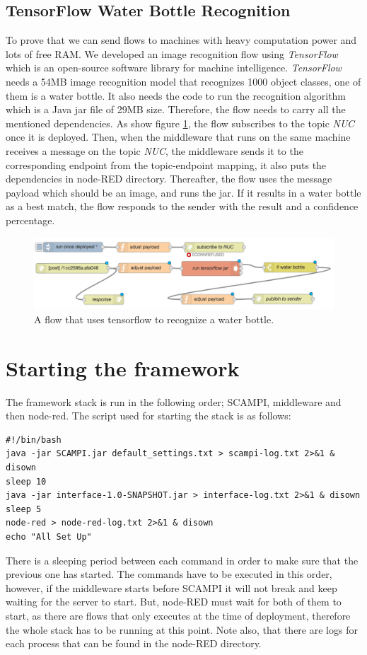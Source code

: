\subsection{TensorFlow Water Bottle Recognition} \label{subsec:tensor}
To prove that we can send flows to machines with heavy computation power and lots of free RAM. We developed an image recognition flow using \textit{TensorFlow} which is an open-source software library for machine intelligence. \textit{TensorFlow} needs a 54MB image recognition model that recognizes 1000 object classes, one of them is a water bottle. It also needs the code to run the recognition algorithm which is a Java jar file of 29MB size. Therefore, the flow  needs to carry all the mentioned dependencies. As show figure \ref{fig:flow-tensor}, the flow subscribes to the topic \textit{NUC} once it is deployed. Then, when the middleware that runs on the same machine receives a message on the topic \textit{NUC}, the middleware sends it to the corresponding endpoint  from the topic-endpoint mapping, it also puts the dependencies in node-RED directory. Thereafter, the flow uses the message payload which should be an image, and runs the jar. If it results in a water bottle as a best match, the flow responds to the sender with the result and a confidence percentage.
 \begin{figure}[H]
	\centering
	\includegraphics[scale=0.6]{images/flow-tensor.png}
	\caption{A flow that uses tensorflow to recognize a water bottle.}
	\label{fig:flow-tensor}
\end{figure} 

\section{Starting the framework}\label{subsec:starting-framework}

The framework stack is run in the following order; SCAMPI, middleware and then node-red. The script used for starting the stack is as follows:
\begin{verbatim}
#!/bin/bash
java -jar SCAMPI.jar default_settings.txt > scampi-log.txt 2>&1 & disown
sleep 10
java -jar interface-1.0-SNAPSHOT.jar > interface-log.txt 2>&1 & disown
sleep 5
node-red > node-red-log.txt 2>&1 & disown
echo "All Set Up"
\end{verbatim}
There is a sleeping period between each command in order to make sure that the previous one has started. The commands have to be executed in this order, however, if the middleware starts before SCAMPI it will not break and keep waiting for the server to start. But, node-RED must wait for both of them to start, as there are flows that only executes at the time of deployment, therefore the whole stack has to be running at this point. Note also, that there are logs for each process that can be found in the node-RED directory. 